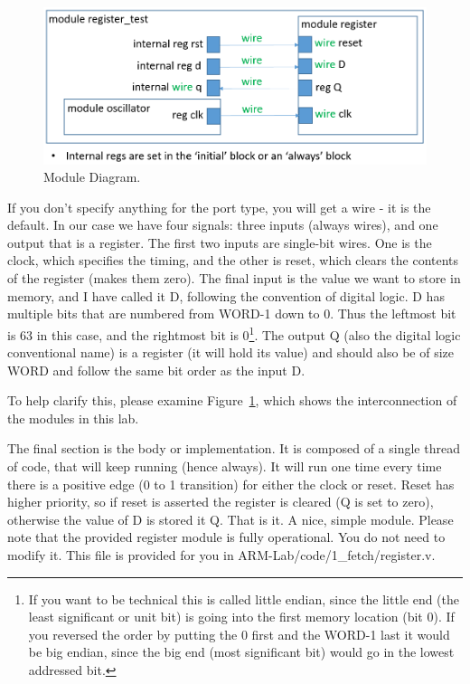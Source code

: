 \begin{figure}
	\caption{Module Diagram.}\label{fig:modulediagram}
	\begin{center}
		\includegraphics[width=4.75in]{../images/register_test_module_diagram.png}
	\end{center}
\end{figure}

If you don't specify anything for the port type, you will get a wire - it is the default.  In our case we have four signals: three inputs (always wires), and one output that is a register.  The first two inputs are single-bit wires.  One is the clock, which specifies the timing, and the other is reset, which clears the contents of the register (makes them zero).  The final input is the value we want to store in memory, and I have called it D, following the convention of digital logic.  D has multiple bits that are numbered from WORD-1 down to 0.  Thus the leftmost bit is 63 in this case, and the rightmost bit is 0\footnote{If you want to be technical this is called little endian, since the little end (the least significant or unit bit) is going into the first memory location (bit 0).  If you reversed the order by putting the 0 first and the WORD-1 last it would be big endian, since the big end (most significant bit) would go in the lowest addressed bit.}.  The output Q (also the digital logic conventional name) is a register (it will hold its value) and should also be of size WORD and follow the same bit order as the input D.

To help clarify this, please examine Figure~\ref{fig:modulediagram}, which shows the interconnection of the modules in this lab.

The final section is the body or implementation.  It is composed of a single thread of code, that will keep running (hence always).  It will run one time every time there is a positive edge (0 to 1 transition) for either the clock or reset.  Reset has higher priority, so if reset is asserted the register is cleared (Q is set to zero), otherwise the value of D is stored it Q.  That is it.  A nice, simple module.  Please note that the provided register module is fully operational.  You do not need to modify it.  This file is provided for you in ARM-Lab/code/1\_fetch/register.v.

